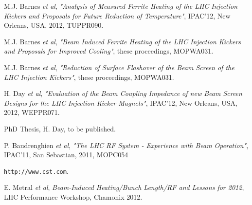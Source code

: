 \documentclass{JAC2003}
\begin{document}
\begin{thebibliography}{9}

M.J. Barnes \emph{et al}, \emph{"Analysis of Measured Ferrite Heating of the LHC Injection Kickers and Proposals for Future Reduction of Temperature"}, IPAC'12, New Orleans, USA, 2012, TUPPR090.

 M.J. Barnes \emph{et al}, \emph{"Beam Induced Ferrite Heating of the LHC Injection Kickers and Proposals for Improved Cooling"}, these proceedings, MOPWA031.

M.J. Barnes \emph{et al}, \emph{"Reduction of Surface Flashover of the Beam Screen of the LHC Injection Kickers"}, these proceedings, MOPWA031.

H. Day \emph{et al}, \emph{"Evaluation of the Beam Coupling Impedance of new Beam Screen Designs for the LHC Injection Kicker Magnets"}, IPAC'12, New Orleans, USA, 2012, WEPPR071.

PhD Thesis, H. Day, to be published.

P. Baudrenghien \emph{et al}, \emph{"The LHC RF System - Experience with Beam Operation"}, IPAC'11, San Sebastian, 2011, MOPC054

\texttt{http://www.cst.com}.

E. Metral \emph{et al}, \emph{Beam-Induced Heating/Bunch Length/RF and Lessons for 2012}, LHC Performance Workshop, Chamonix 2012. 


\end{thebibliography}
\end{document}
